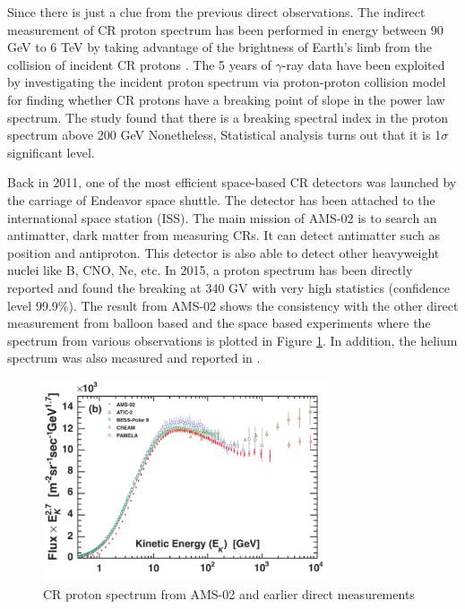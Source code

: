 Since there is just a clue from the previous direct observations.
The indirect measurement of CR proton spectrum has been performed in
energy between 90 GeV to 6 TeV by taking advantage of the brightness of
Earth's limb from the collision of incident CR protons \citep{FermiEarth14}.
The 5 years of $\gamma$-ray data have been exploited by investigating the incident proton spectrum via proton-proton collision model for finding whether CR protons have a breaking point of slope in the power 
law spectrum. The study found that there is a breaking spectral index
in the proton spectrum above 200 GeV 
Nonetheless, Statistical analysis turns out that it is 1$\sigma$
significant level.


Back in 2011, one of the most efficient
space-based CR detectors was launched by the carriage of Endeavor
space shuttle. The detector has been attached to the international space station (ISS). The main mission of AMS-02 is to search an 
antimatter, dark matter from measuring CRs. It can
detect antimatter such as position and antiproton. This detector
is also able to detect other heavyweight nuclei like B, CNO,
Ne, etc. In 2015, a proton spectrum has been directly
reported and found the breaking at 340 GV \citep{AMS02pr2015}
with very high statistics (confidence level 99.9\%).
The result from AMS-02 shows the consistency with the other direct 
measurement from balloon based and the space based experiments
where the spectrum from various observations is plotted in 
Figure \ref{fig:ams02proton}.
In addition, the helium spectrum
was also measured and reported in \cite{Heliumflux2015}. 


\begin{figure}[h!]
    \centering
    \includegraphics[width=0.75\textwidth]{content/literature_review/figures/direct_proton_measurement.png}
    \caption{
        CR proton spectrum from AMS-02 and earlier direct measurements
        \citep{AMS02pr2015}
    }
    \label{fig:ams02proton}
\end{figure}


